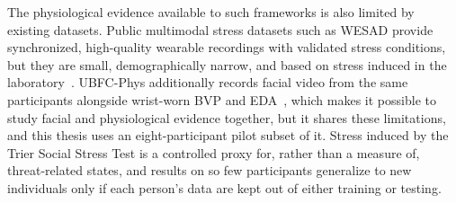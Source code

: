 The physiological evidence available to such frameworks is also limited by existing datasets. Public multimodal stress datasets such as WESAD provide synchronized, high-quality wearable recordings with validated stress conditions, but they are small, demographically narrow, and based on stress induced in the laboratory~\cite{schmidt2018}. UBFC-Phys additionally records facial video from the same participants alongside wrist-worn BVP and EDA~\cite{sabour2023}, which makes it possible to study facial and physiological evidence together, but it shares these limitations, and this thesis uses an eight-participant pilot subset of it. Stress induced by the Trier Social Stress Test is a controlled proxy for, rather than a measure of, threat-related states, and results on so few participants generalize to new individuals only if each person's data are kept out of either training or testing.





